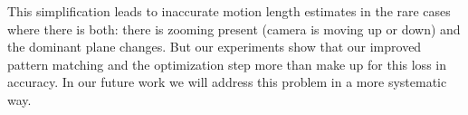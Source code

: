 \documentclass[letterpaper, 10 pt, conference]{ieeeconf}  %
\begin{document}
This simplification leads to inaccurate motion length estimates in the rare cases where there is both: there is zooming present (camera is moving up or down) and the dominant plane changes. But our experiments show that our improved pattern matching and the optimization step more than make up for this loss in accuracy. In our future work we will address this problem in a more systematic way.







\end{document}
